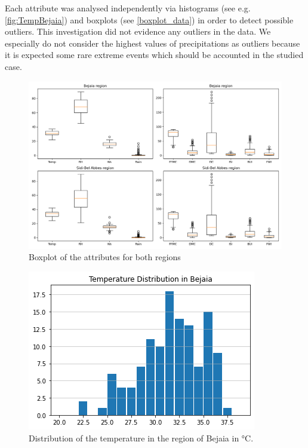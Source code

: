 \documentclass[10pt]{article}
\numberwithin{equation}{section}
\numberwithin{figure}{section}
\numberwithin{table}{section}
\begin{document}
Each attribute was analysed independently via histograms (see e.g. \autoref{fig:TempBejaia}) and boxplots (see \autoref{boxplot_data}) in order to detect possible outliers. This investigation did not evidence any outliers in the data. We especially do not consider the highest values of precipitations as outliers because it is expected some rare extreme events which should be accounted in the studied case.  

\begin{figure}[H]
    \centering
    \includegraphics[width=\textwidth,height=\textheight,keepaspectratio]{Figures/boxplot_data.png}
    \caption{Boxplot of the attributes for both regions}
    \label{boxplot_data}
\end{figure}

\begin{figure} [H]
    \centering
    \includegraphics[scale=0.65]{Figures/Temp_Bejaia.png}
    \caption{Distribution of the temperature in the region of Bejaia in °C.}
    \label{fig:TempBejaia}
\end{figure}
\end{document}
